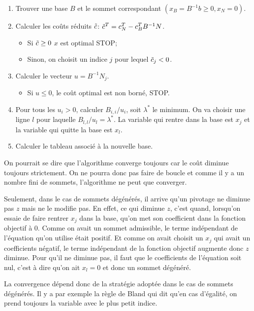 \begin{enumerate}
  \item Trouver une base $B$ et le sommet correspondant
    $(x_B = B^{-1}b \geq 0, x_N = 0)$.
  \item Calculer les coûts réduits $\tilde{c}$:
    $\tilde{c}^T = c_N^T - c_B^{T}B^{-1}N$.
    \begin{itemize}
      \item Si $\tilde{c} \geq 0$ $x$ est optimal STOP;
      \item Sinon, on choisit un indice $j$ pour lequel $\tilde{c}_j < 0$.
    \end{itemize}
  \item Calculer le vecteur $u = B^{-1}N_j$.
    \begin{itemize}
      \item Si $u \leq 0$, le coût optimal est non borné, STOP.
    \end{itemize}
  \item Pour tous les $u_i > 0$, calculer $B_{i,i}/u_i$,
    soit $\lambda^*$ le minimum.
    On va choisir une ligne $l$ pour laquelle $B_{l,l}/u_l = \lambda^*$.
    La variable qui rentre dans la base est $x_j$ et la variable qui
    quitte la base est $x_l$.
  \item
    Calculer le tableau associé à la nouvelle base.
\end{enumerate}
On pourrait se dire que l'algorithme converge toujours
car le coût diminue toujours strictement.
On ne pourra donc pas faire de boucle et
comme il y a un nombre fini de sommets,
l'algorithme ne peut que converger.

Seulement, dans le cas de sommets dégénérés, il arrive qu'un pivotage
ne diminue pas $z$ mais ne le modifie pas.
En effet, ce qui diminue $z$, c'est quand,
lorsqu'on essaie de faire rentrer $x_j$ dans la base,
qu'on met son coefficient dans la fonction objectif à 0.
Comme on avait un sommet admissible, le terme indépendant de l'équation
qu'on utilise était positif.
Et comme on avait choisit un $x_j$ qui avait un coefficients négatif,
le terme indépendant de la fonction objectif augmente donc $z$ diminue.
Pour qu'il ne diminue pas,
il faut que le coefficients de l'équation soit nul, c'est à dire
qu'on ait $x_l = 0$ et donc un sommet dégénéré.

La convergence dépend donc de la stratégie adoptée dans le cas de sommets
dégénérés.
Il y a par exemple la règle de Bland qui dit qu'en cas d'égalité,
on prend toujours la variable avec le plus petit indice.

